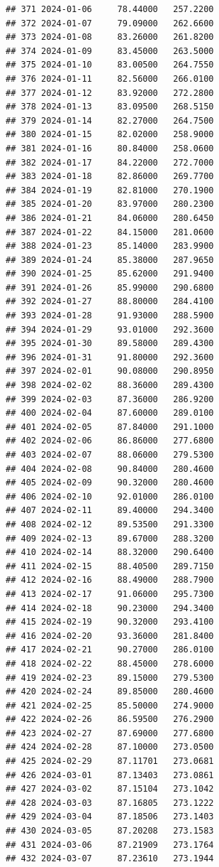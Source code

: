 \documentclass[
]{article}
\begin{document}
\begin{verbatim}
## 371 2024-01-06     78.44000   257.2200
## 372 2024-01-07     79.09000   262.6600
## 373 2024-01-08     83.26000   261.8200
## 374 2024-01-09     83.45000   263.5000
## 375 2024-01-10     83.00500   264.7550
## 376 2024-01-11     82.56000   266.0100
## 377 2024-01-12     83.92000   272.2800
## 378 2024-01-13     83.09500   268.5150
## 379 2024-01-14     82.27000   264.7500
## 380 2024-01-15     82.02000   258.9000
## 381 2024-01-16     80.84000   258.0600
## 382 2024-01-17     84.22000   272.7000
## 383 2024-01-18     82.86000   269.7700
## 384 2024-01-19     82.81000   270.1900
## 385 2024-01-20     83.97000   280.2300
## 386 2024-01-21     84.06000   280.6450
## 387 2024-01-22     84.15000   281.0600
## 388 2024-01-23     85.14000   283.9900
## 389 2024-01-24     85.38000   287.9650
## 390 2024-01-25     85.62000   291.9400
## 391 2024-01-26     85.99000   290.6800
## 392 2024-01-27     88.80000   284.4100
## 393 2024-01-28     91.93000   288.5900
## 394 2024-01-29     93.01000   292.3600
## 395 2024-01-30     89.58000   289.4300
## 396 2024-01-31     91.80000   292.3600
## 397 2024-02-01     90.08000   290.8950
## 398 2024-02-02     88.36000   289.4300
## 399 2024-02-03     87.36000   286.9200
## 400 2024-02-04     87.60000   289.0100
## 401 2024-02-05     87.84000   291.1000
## 402 2024-02-06     86.86000   277.6800
## 403 2024-02-07     88.06000   279.5300
## 404 2024-02-08     90.84000   280.4600
## 405 2024-02-09     90.32000   280.4600
## 406 2024-02-10     92.01000   286.0100
## 407 2024-02-11     89.40000   294.3400
## 408 2024-02-12     89.53500   291.3300
## 409 2024-02-13     89.67000   288.3200
## 410 2024-02-14     88.32000   290.6400
## 411 2024-02-15     88.40500   289.7150
## 412 2024-02-16     88.49000   288.7900
## 413 2024-02-17     91.06000   295.7300
## 414 2024-02-18     90.23000   294.3400
## 415 2024-02-19     90.32000   293.4100
## 416 2024-02-20     93.36000   281.8400
## 417 2024-02-21     90.27000   286.0100
## 418 2024-02-22     88.45000   278.6000
## 419 2024-02-23     89.15000   279.5300
## 420 2024-02-24     89.85000   280.4600
## 421 2024-02-25     85.50000   274.9000
## 422 2024-02-26     86.59500   276.2900
## 423 2024-02-27     87.69000   277.6800
## 424 2024-02-28     87.10000   273.0500
## 425 2024-02-29     87.11701   273.0681
## 426 2024-03-01     87.13403   273.0861
## 427 2024-03-02     87.15104   273.1042
## 428 2024-03-03     87.16805   273.1222
## 429 2024-03-04     87.18506   273.1403
## 430 2024-03-05     87.20208   273.1583
## 431 2024-03-06     87.21909   273.1764
## 432 2024-03-07     87.23610   273.1944

\end{verbatim}
\end{document}
